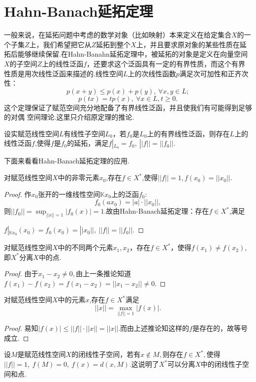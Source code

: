 \documentclass[lang=cn,10pt]{elegantbook}
\begin{document}
	\section{Hahn-Banach延拓定理}
	一般来说，在延拓问题中考虑的数学对象（比如映射）本来定义在给定集合\(X\)的一个子集\(Z\)上，我们希望把它从\(Z\)延拓到整个\(X\)上，并且要求原对象的某些性质在延拓后能够继续保留.在Hahn-Banahn延拓定理中，被延拓的对象是定义在向量空间\(X\)的子空间\(Z\)上的线性泛函\(f\)，还要求这个泛函具有一定的有界性质，而这个有界性质是用次线性泛函来描述的.线性空间\(L\)上的次线性函数\(p\)满足次可加性和正齐次性：
	\[p(x+y)\le p(x)+p(y),\ \forall x,y\in L;\]
	\[p(tx)=tp(x),\ \forall x\in L,t\ge0.\]
	这个定理保证了赋范空间充分地配备了有界线性泛函，并且使我们有可能得到足够的对偶
	空间理论.这里只介绍原定理的推论.
	\begin{theorem}
		设实赋范线性空间\(L\)有线性子空间\(L_0\)，若\(f_0\)是\(L_0\)上的有界线性泛函，则存在\(L\)上的线性泛函\(f\),使得\(f\)是\(f_0\)的延拓，满足\(f|_{L_0}=f_0,\ ||f||=||f_0||.\)
	\end{theorem}
	下面来看看Hahn-Banach延拓定理的应用.
	\begin{corollary}
		对赋范线性空间\(X\)中的非零元素\(x_0\),存在\(f\in X^*\),使得\(||f||=1,f(x_0)=||x_0||.\)
	\end{corollary}
	\begin{proof}
		作\(x_0\)张开的一维线性空间\(\mathbb{K}x_0\)上的泛函\(f_0\):
		\[f_0(ax_0)=|a|\cdot||x_0||,\]
		则\(||f_0||=\sup_{||x||=1}|f_0(x)|=1\).故由Hahn-Banach延拓定理：存在\(f\in X^*\),满足
		
		\(f|_{\mathbb{K}x_0}(x_0)=f_0(x_0)=||x_0||,\ ||f||=||f_0||.\)
	\end{proof}
	\begin{corollary}[分离性1]
		对赋范线性空间\(X\)中的不同两个元素\(x_1,x_2\)，存在\(f\in X^*\)，使得\(f(x_1)\ne f(x_2)\),即\(X^*\)分离\(X\)中的点.
	\end{corollary}
	\begin{proof}
		由于\(x_1-x_2\ne0,\)由上一条推论知道\(f(x_1)-f(x_2)=f(x_1-x_2)=||x_1-x_2||\ne0.\)
	\end{proof}
	\begin{corollary}[对偶]
		对赋范线性空间\(X\)中的元素\(x\),存在\(f\in X^*\)满足
		\[||x||=\max_{||f||=1}|f(x)|.\]
	\end{corollary}
	\begin{proof}
		易知\(|f(x)|\le||f||\cdot||x||=||x||.\)而由上述推论知这样的\(f\)是存在的，故等号成立.
	\end{proof}
	\begin{corollary}[分离性2]
		设\(M\)是赋范线性空间\(X\)的闭线性子空间，若有\(x \notin M,\)则存在\(f\in X^*,\)使得\(||f||=1,\ f(M)=0,\ f(x)=d(x,M).\)这说明了\(X^*\)可以分离\(X\)中的闭线性子空间和点.
	\end{corollary}
	
\end{document}

